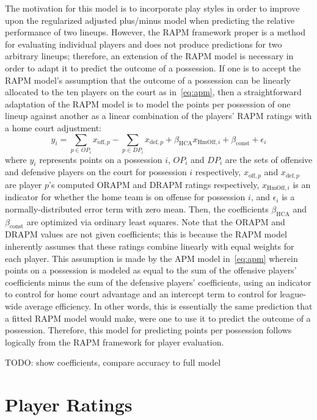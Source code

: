 The motivation for this model is to incorporate play styles in order to improve upon
the regularized adjusted plus/minus model when predicting the relative performance
of two lineups. However, the RAPM framework proper is a method for evaluating
individual players and does not produce predictions for two arbitrary lineups;
therefore, an extension of the RAPM model is necessary in order to adapt it to
predict the outcome of a possession.  If one is to accept the RAPM model's
assumption that the outcome of a possession can be linearly allocated to the ten
players on the court as in~\eqref{eq:apm}, then a straightforward adaptation of the
RAPM model is to model the points per possession of one lineup against another as a
linear combination of the players' RAPM ratings with a home court adjustment:
\begin{equation} \label{eqn:baseline}
    y_i = \sum_{p \in OP_i} x_{\text{off}, p} - \sum_{p \in DP_i} x_{\text{def}, p}
    + \beta_{\text{HCA}}x_{\text{HmOff},i} + \beta_{\text{const}} + \epsilon_i
\end{equation}
where $y_i$ represents points on a possession $i$, $OP_i$ and $DP_i$ are the sets of
offensive and defensive players on the court for possession $i$ respectively,
$x_{\text{off}, p}$ and $x_{\text{def}, p}$ are player $p$'s computed ORAPM and
DRAPM ratings respectively, $x_{\text{HmOff}, i}$ is an indicator for whether the
home team is on offense for possession $i$, and $\epsilon_i$ is a
normally-distributed error term with zero mean. Then, the coefficients
$\beta_{\text{HCA}}$ and $\beta_{\text{const}}$ are optimized via ordinary least
squares. Note that the ORAPM and DRAPM values are not given coefficients; this is
because the RAPM model inherently assumes that these ratings combine linearly with
equal weights for each player. This assumption is made by the APM model
in~\eqref{eq:apm} wherein points on a possession is modeled as equal to the sum of
the offensive players' coefficients minus the sum of the defensive players'
coefficients, using an indicator to control for home court advantage and an
intercept term to control for league-wide average efficiency. In other words, this
is essentially the same prediction that a fitted RAPM model would make, were one to
use it to predict the outcome of a possession. Therefore, this model for predicting
points per possession follows logically from the RAPM framework for player
evaluation.

TODO: show coefficients, compare accuracy to full model

\section{Player Ratings}

